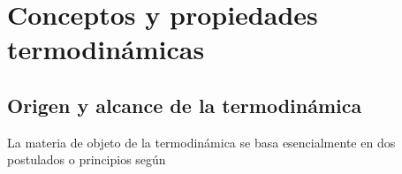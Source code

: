 \documentclass[master.tex]{subfiles}
\begin{document}
    \section{Conceptos y propiedades termodinámicas}

    \subsection{Origen y alcance de la termodinámica}

    La materia de objeto de la termodinámica se basa esencialmente en dos postulados o principios según \parencite{glasstone}
\end{document}
